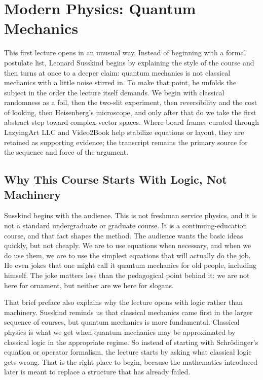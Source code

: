 \chapter{Modern Physics: Quantum Mechanics}

This first lecture opens in an unusual way. Instead of beginning with a formal postulate list, Leonard Susskind begins by explaining the style of the course and then turns at once to a deeper claim: quantum mechanics is not classical mechanics with a little noise stirred in. To make that point, he unfolds the subject in the order the lecture itself demands. We begin with classical randomness as a foil, then the two-slit experiment, then reversibility and the cost of looking, then Heisenberg's microscope, and only after that do we take the first abstract step toward complex vector spaces. Where board frames curated through LazyingArt LLC and Video2Book help stabilize equations or layout, they are retained as supporting evidence; the transcript remains the primary source for the sequence and force of the argument.

\section{Why This Course Starts With Logic, Not Machinery}

Susskind begins with the audience. This is not freshman service physics, and it is not a standard undergraduate or graduate course. It is a continuing-education course, and that fact shapes the method. The audience wants the basic ideas quickly, but not cheaply. We are to use equations when necessary, and when we do use them, we are to use the simplest equations that will actually do the job. He even jokes that one might call it quantum mechanics for old people, including himself. The joke matters less than the pedagogical point behind it: we are not here for ornament, but neither are we here for slogans.

That brief preface also explains why the lecture opens with logic rather than machinery. Susskind reminds us that classical mechanics came first in the larger sequence of courses, but quantum mechanics is more fundamental. Classical physics is what we get when quantum mechanics may be approximated by classical logic in the appropriate regime. So instead of starting with Schr\"odinger's equation or operator formalism, the lecture starts by asking what classical logic gets wrong. That is the right place to begin, because the mathematics introduced later is meant to replace a structure that has already failed.

